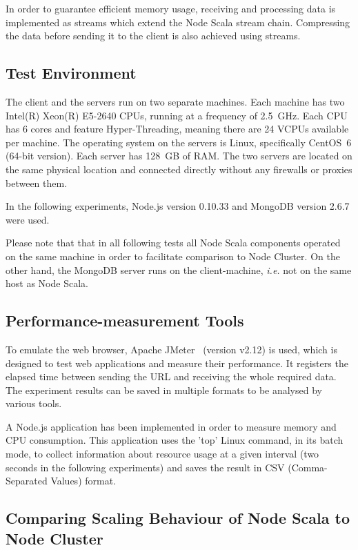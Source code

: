 \documentclass[10pt,conference,letterpaper]{IEEEtran}
\begin{document}
In order to guarantee efficient memory usage, receiving and processing
data is implemented as streams which extend the Node Scala stream
chain. Compressing the data before sending it to the client is also
achieved using streams.

\subsection{Test Environment}

The client and the servers run on two separate machines. Each machine
has two Intel(R) Xeon(R) E5-2640 CPUs, running at a frequency of
2.5~GHz. Each CPU has 6 cores and feature Hyper-Threading, meaning
there are 24 VCPUs available per machine. The operating system on the
servers is Linux, specifically CentOS~6 (64-bit version). Each server
has 128~GB of RAM. The two servers are located on the same physical location and
connected directly without any firewalls or proxies between them.

In the following experiments, Node.js version 0.10.33 and MongoDB version 2.6.7 were used.

Please note that that in all following tests all Node Scala components
operated on the same machine in order to facilitate comparison to Node
Cluster. On the other hand, the MongoDB server runs on the
client-machine, \textit{i.e.} not on the same host as Node Scala.

\subsection{Performance-measurement Tools}

To emulate the web browser, Apache JMeter~\cite{JMeter} (version
v2.12) is used, which is designed to test web applications and measure
their performance. It registers the elapsed time between sending the
URL and receiving the whole required data. The experiment results can
be saved in multiple formats to be analysed by various tools.

A Node.js application has been implemented in order to measure memory
and CPU consumption. This application uses the 'top' Linux command, in
its batch mode, to collect information about resource usage at a given
interval (two seconds in the following experiments) and saves the
result in CSV (Comma-Separated Values) format.

\subsection{Comparing Scaling Behaviour of Node Scala to Node Cluster}
\end{document}
